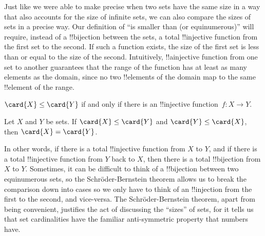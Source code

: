 \documentclass[../../include/open-logic-section]{subfiles}
\begin{document}


\begin{explain}
Just like we were able to make precise when two sets have the same
size in a way that also accounts for the size of infinite sets, we can
also compare the sizes of sets in a precise way. Our definition of
``is smaller than (or equinumerous)'' will require, instead of a
!!{bijection} between the sets, a total !!{injective} function from the first
set to the second. If such a function exists, the size of the first
set is less than or equal to the size of the second.  Intuitively, 
!!a{injective} function from one set to another guarantees that the range of
the function has at least as many elements as the domain, since no two
!!{element}s of the domain map to the same !!{element} of the range.
\end{explain}

\begin{defn}
$\card{X} \leq \card{Y}$ if and only if there is an !!{injective}
  function~$f \colon X \to Y$.
\end{defn}

\begin{thm}
Let $X$ and $Y$ be sets. If $\card{X} \leq \card{Y}$ and $\card{Y}
\leq \card{X}$, then $\card{X} = \card{Y}$.
\end{thm}

\begin{explain}
In other words, if there is a total !!{injective} function from $X$ to
$Y$, and if there is a total !!{injective} function from $Y$ back to $X$,
then there is a total !!{bijection} from $X$ to $Y$. Sometimes, it can be
difficult to think of a !!{bijection} between two equinumerous sets, so
the Schr\"oder-Bernstein theorem allows us to break the comparison
down into cases so we only have to think of an !!{injection} from the
first to the second, and vice-versa. The Schr\"oder-Bernstein theorem,
apart from being convenient, justifies the act of discussing the
``sizes'' of sets, for it tells us that set cardinalities have the
familiar anti-symmetric property that numbers have.
\end{explain}
\end{document}
